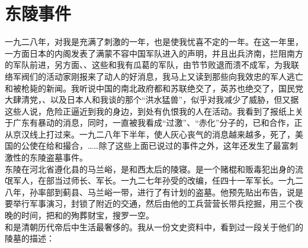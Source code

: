 \fancyhead[RO]{} %
\fancyhead[LE]{} %
\chapter*{东陵事件}
\thispagestyle{empty}
一九二八年，对我是充满了刺激的一年，也是使我忧喜不定的一年。在这一年里，一方面日本的内阁发表了满蒙不容中国军队进入的声明，并且出兵济南，拦阻南方的军队前进，另方面、、这些和我有瓜葛的军队，由节节败退而溃不成军，为我联络军阀们的活动家刚报来了动人的好消息，我马上又读到那些向我效忠的军人逃亡和被枪毙的新闻。我听说中国的南北政府都和苏联绝交了，英苏也绝交了，国民党大肆清党，、以及日本人和我谈的那个“洪水猛兽”，似乎对我减少了威胁，但又据这些人说，危险正逼近到我的身边，到处有仇恨我的人在活动。我看到了报纸上关于广东有暴动的消息，同时，一直被我看成“过激”、“赤化”分子的，已和合作，正从京汉线上打过来。一九二八年下半年，使人灰心丧气的消息越来越多，死了，美国的公使在给和撮合，……除了这些上面已说过的事件之外，这年还发生了最富刺激性的东陵盗墓事件。\\

东陵在河北省遵化县的马兰峪，是和西太后的陵寝。是一个赌棍和贩毒犯出身的流氓军人，在部当过师长、军长。一九二七年孙受的改编，任四十一军军长。一九二八年，孙率部到蓟县、马兰峪一带，进行了有计划的盗墓。他预先贴出布告，说是要举行军事演习，封锁了附近的交通，然后由他的工兵营营长带兵挖掘，用三个夜晚的时间，把和的殉葬财宝，搜罗一空。\\

和是清朝历代帝后中生活最奢侈的。我从一份文史资料中，看到过一段关于他们的陵墓的描述：\\

